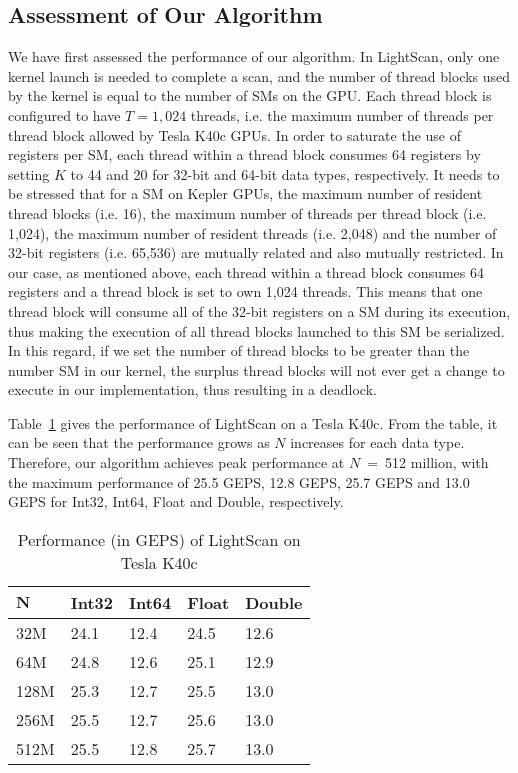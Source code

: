 \documentclass[article]{elsarticle}
\renewcommand{\hl}[1]{#1}
\begin{document}
{\subsection{Assessment of Our Algorithm}
We have first assessed the performance of our algorithm. In LightScan, only one kernel launch is needed to complete a scan, and the number of thread blocks used by the kernel is equal to the number of SMs on the GPU. Each thread block is configured to have $T=1,024$ threads, i.e. the maximum number of threads per thread block allowed by Tesla K40c GPUs. In order to saturate the use of registers per SM, each thread within a thread block consumes 64 registers by setting $K$ to 44 and 20 for 32-bit and 64-bit data types, respectively. \hl{It needs to be stressed that for a SM on Kepler GPUs, the maximum number of resident thread blocks (i.e. 16), the maximum number of threads per thread block (i.e. 1,024), the maximum number of resident threads (i.e. 2,048) and the number of 32-bit registers (i.e. 65,536) are mutually related and also mutually restricted. In our case, as mentioned above, each thread within a thread block consumes 64 registers and a thread block is set to own 1,024 threads. This means that one thread block will consume all of the 32-bit registers on a SM during its execution, thus making the execution of all thread blocks launched to this SM be serialized. In this regard, if we set the number of thread blocks to be greater than the number SM in our kernel, the surplus thread blocks will not ever get a change to execute in our implementation, thus resulting in a deadlock.}

Table~\ref{tab:lightscan} gives the performance of LightScan on a Tesla K40c. From the table, it can be seen that the performance grows as $N$ increases for each data type. Therefore, our algorithm achieves peak performance at $N$~=~512 million, with the maximum performance of 25.5 GEPS, 12.8 GEPS, 25.7 GEPS and 13.0 GEPS for Int32, Int64, Float and Double, respectively.
\begin{table}[!h]
\centering
\caption{Performance (in GEPS) of LightScan on Tesla K40c}
\label{tab:lightscan}
\begin{tabular}{|l||l||l||l||l|}
\hline
$\textbf{N}$&	\textbf{Int32}&	\textbf{Int64}&	\textbf{Float}&	\textbf{Double}\\
\hline
32M&	24.1&	12.4&	24.5&	12.6\\
\hline
64M&	24.8&	12.6&	25.1&	12.9\\
\hline
128M&	25.3&	12.7&	25.5&	13.0\\
\hline
256M&	25.5&	12.7&	25.6&	13.0\\
\hline
512M&	25.5&	12.8&	25.7&	13.0\\
\hline
\end{tabular}
\end{table}

}
\end{document}
